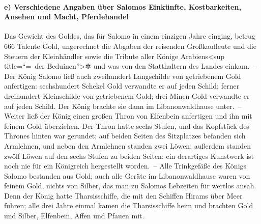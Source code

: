 \hypertarget{e-verschiedene-angaben-uxfcber-salomos-einkuxfcnfte-kostbarkeiten-ansehen-und-macht-pferdehandel}{%
\paragraph{e) Verschiedene Angaben über Salomos Einkünfte,
Kostbarkeiten, Ansehen und Macht,
Pferdehandel}\label{e-verschiedene-angaben-uxfcber-salomos-einkuxfcnfte-kostbarkeiten-ansehen-und-macht-pferdehandel}}

Das Gewicht des Goldes, das für Salomo in einem einzigen
Jahre einging, betrug 666 Talente Gold, ungerechnet die
Abgaben der reisenden Großkaufleute und die Steuern der Kleinhändler
sowie die Tribute aller Könige Arabiens\textless sup title=``=~der
Beduinen''\textgreater✲ und was von den Statthaltern des Landes
einkam.~-- Der König Salomo ließ auch zweihundert
Langschilde von getriebenem Gold anfertigen: sechshundert Schekel Gold
verwandte er auf jeden Schild; ferner dreihundert
Kleinschilde von getriebenem Gold; drei Minen Gold verwandte er auf
jeden Schild. Der König brachte sie dann im Libanonwaldhause unter.~--
Weiter ließ der König einen großen Thron von Elfenbein
anfertigen und ihn mit feinem Gold überziehen. Der Thron
hatte sechs Stufen, und das Kopfstück des Thrones hinten war gerundet;
auf beiden Seiten des Sitzplatzes befanden sich Armlehnen, und neben den
Armlehnen standen zwei Löwen; außerdem standen zwölf
Löwen auf den sechs Stufen zu beiden Seiten: ein derartiges Kunstwerk
ist noch nie für ein Königreich hergestellt worden.~--
Alle Trinkgefäße des Königs Salomo bestanden aus Gold;
auch alle Geräte im Libanonwaldhause waren von feinem Gold, nichts von
Silber, das man zu Salomos Lebzeiten für wertlos ansah.
Denn der König hatte Tharsisschiffe, die mit den Schiffen
Hirams über Meer fuhren; alle drei Jahre einmal kamen die Tharsisschiffe
heim und brachten Gold und Silber, Elfenbein, Affen und Pfauen mit.


